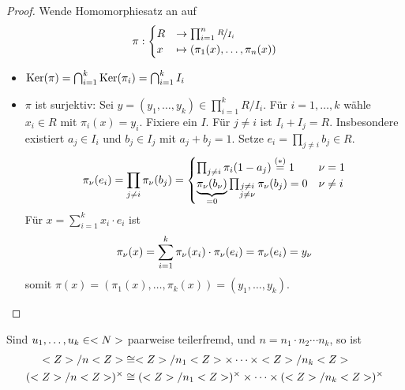 \begin{proof}
	Wende Homomorphiesatz an auf
	\begin{align}
	\pi: \begin{cases}
	R &\to \prod_{i=1}^{n} \nicefrac{R}{I_i} \\
	x &\mapsto (\pi_1(x), \dots, \pi_n(x))
	\end{cases} \notag
	\end{align}
	\begin{itemize}
		\item $\operatorname{Ker}(\pi) = \bigcap_{i=1}^{k}\operatorname{Ker}(\pi_i) = \bigcap_{i=1}^{k} I_i$
		\item $\pi$ ist surjektiv: Sei $y=(y_1, \dots, y_k) \in \prod_{i=1}^{k} R/I_i$. Für $i = 1,\dots,k$ wähle $x_i \in R$ mit $\pi_i(x) = y_i$. Fixiere ein $I$. Für $j \neq i$ ist $I_i + I_j = R$. Insbesondere existiert $a_j \in I_i$ und $b_j \in I_j$ mit $a_j + b_j = 1$. Setze $e_i = \prod_{j\neq i} b_j \in R$.
		\begin{align}
		\pi_{\nu}(e_i) = \prod_{j \neq i} \pi_{\nu}(b_j) = \begin{cases}
		\prod_{j\neq i} \pi_i(1-a_j) \overset{(\ast)}{=} 1 & \nu = 1\\
		\underbrace{\pi_{\nu}(b_{\nu})}_{=0}\prod_{\substack{j\neq i \\ j \neq \nu}} \pi_{\nu}(b_j) = 0 & \nu \neq i
		\end{cases}\notag %
		\end{align}
		Für $x = \sum_{i=1}^{k}x_i \cdot e_i$ ist 
		\begin{align}
			\pi_{\nu}(x) = \sum_{i=1}^{k} \pi_{\nu}(x_i)\cdot\pi_{\nu}(e_i) = \pi_{\nu}(e_i) = y_{\nu} \notag
		\end{align}
		somit $\pi(x) = (\pi_1(x), \dots, \pi_k(x)) = (y_1, \dots, y_k)$. 
	\end{itemize}
\end{proof}

\begin{conclusion}
	Sind $u_1, \dots, u_k \in <N>$ paarweise teilerfremd, und $n = n_1\cdot n_2 \cdots n_k$, so ist
	\begin{align}
		<Z> / n<Z> &\cong <Z> / n_1 <Z> \times \cdots \times <Z> / n_k <Z> \notag \\
		(<Z> / n<Z>)^{\times} &\cong (<Z> / n_1 <Z>)^{\times} \times \cdots \times (<Z> / n_k <Z>)^{\times} \notag
	\end{align}
\end{conclusion}

